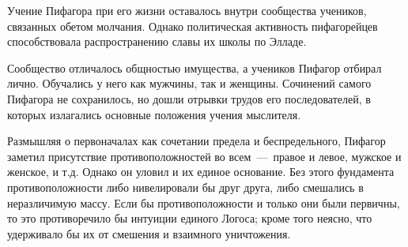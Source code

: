 

Учение Пифагора при его жизни оставалось внутри сообщества учеников, связанных обетом молчания. Однако политическая активность пифагорейцев способствовала распространению славы их школы по Элладе.

Сообщество отличалось общностью имущества, а учеников Пифагор отбирал лично. Обучались у него как мужчины, так и женщины. Сочинений самого Пифагора не сохранилось, но дошли отрывки трудов его последователей, в которых излагались основные положения учения
мыслителя. 



Размышляя о первоначалах как сочетании предела и беспредельного, Пифагор заметил присутствие противоположностей во всем~---~правое и левое, мужское и женское, и т.д. Однако он уловил и их единое основание. Без этого фундамента противоположности либо нивелировали бы друг друга, либо смешались в неразличимую массу. Если бы противоположности и только они были первичны, то это противоречило бы интуиции единого Логоса; кроме того неясно, что удерживало бы их от смешения и взаимного уничтожения.

